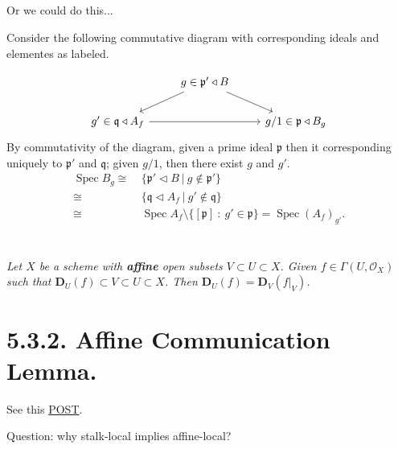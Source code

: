 \subsection{}

Or we could do this...

Consider the following commutative diagram with corresponding ideals and elementes as labeled.

\[\begin{tikzcd}
	& {g\in\mathfrak p'\triangleleft B} \\
	{g'\in\mathfrak q\triangleleft A_f} && {g/1\in\mathfrak p\triangleleft B_g}
	\arrow[from=1-2, to=2-1]
	\arrow[from=1-2, to=2-3]
	\arrow[from=2-1, to=2-3]
\end{tikzcd}\]
By commutativity of the diagram, given a prime ideal $\mathfrak p$ then it corresponding uniquely to $\mathfrak p'$ and $\mathfrak q$; given $g/1$, then there exist $g$ and $g'$.
\begin{align*}
	\operatorname{Spec}B_g 
	\cong &~ \{\mathfrak p'\triangleleft B ~\vert~ g\notin \mathfrak p'\}\\
	\cong &~ \{\mathfrak q\triangleleft A_f ~\vert~ g'\notin \mathfrak q\}\\
	\cong &~ \operatorname{Spec}A_f\setminus \{[\mathfrak p] ~:~ g'\in \mathfrak p\}=\operatorname{Spec}(A_f)_{g'}.
\end{align*}

\section{}
\textit{Let $X$ be a scheme with \textbf{affine} open subsets $V\subset U\subset X$. Given $f\in \Gamma (U,\mathcal O_X)$ such that $\mathbf D_U(f)\subset V\subset U\subset X$. Then $\mathbf D_U(f)=\mathbf D_V(f\vert_V)$.}
\begin{comment}
\begin{proof}
It suffices to check $\mathbf V_U(f)=\mathbf V_V(f\vert_V)$. 
\begin{align*}
	\mathbf V_U(f) = &~ \{\mathfrak p\in U ~\vert~ f\in\mathfrak p\}\\
	= &~ \{\mathfrak p\in V ~\vert~ f\vert_V\in \mathfrak p\}\\
	= &~ \mathbf V_V(f\vert_V)
\end{align*}
\end{proof}
\end{comment}

\section{5.3.2. Affine Communication Lemma.}

See this \href{http://mathbabysteps.blogspot.com/2016/12/affine-communication-lemma.html}{POST}.

Question: why stalk-local implies affine-local?